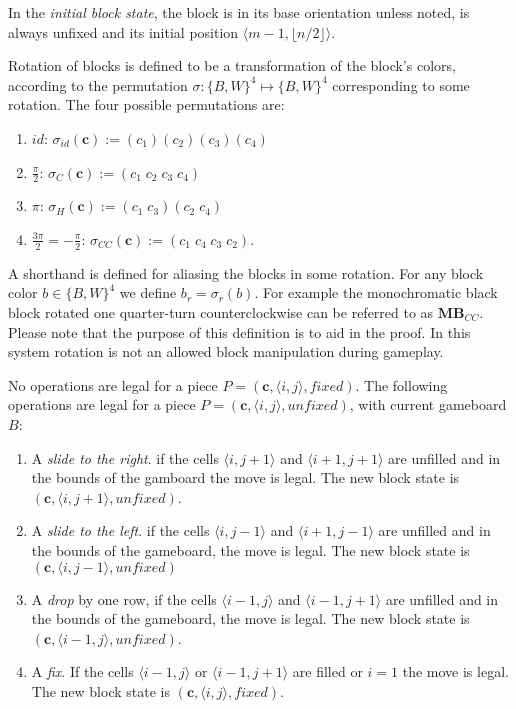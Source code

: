 \begin{description}[style=unboxed, leftmargin=0cm,labelsep=1em]
In the \textit{initial block state}, the block is in its base orientation unless noted, is always unfixed and its initial position $\langle m-1, \lfloor n/2 \rfloor \rangle$.

    \item[Rotating blocks] Rotation of blocks is defined to be a transformation of the block's colors, according to the permutation $\sigma: \{B,W\}^4 \mapsto \{B,W\}^4$ corresponding to some rotation. The four possible permutations are:

    \begin{enumerate}
        \item $id$: $\sigma_{id}(\mathbf{c}) := (c_1)(c_2)(c_3)(c_4)$
        \item $\frac{\pi}{2}$: $\sigma_{C}(\mathbf{c}) := (c_1\;c_2\;c_3\;c_4)$
        \item $\pi$: $\sigma_{H}(\mathbf{c}) := (c_1\;c_3)(c_2\;c_4)$
        \item $\frac{3 \pi}{2} = -\frac{\pi}{2}$: $\sigma_{CC}(\mathbf{c}) := (c_1\;c_4\;c_3\;c_2)$.
    \end{enumerate}

    A shorthand is defined for aliasing the blocks in some rotation. For any block color $b \in \{B, W\}^4$ we define $b_{r} = \sigma_{r}(b)$. For example the monochromatic black block rotated one quarter-turn counterclockwise can be referred to as $\mathbf{MB}_{CC}$. Please note that the purpose of this definition is to aid in the proof. In this system rotation is not an allowed block manipulation during gameplay.

    \item[Game operations] No operations are legal for a piece $P = (\mathbf{c}, \langle i,j \rangle, fixed)$. The following operations are legal for a piece $P = (\mathbf{c}, \langle i,j \rangle, unfixed)$, with current gameboard $B$:

    \begin{enumerate}
        \item A \emph{slide to the right}. if the cells $\langle i,j+1 \rangle$ and $\langle i+1, j+1 \rangle$ are unfilled and in the bounds of the gamboard the move is legal. The new block state is $(\mathbf{c}, \langle i, j+1 \rangle, unfixed)$.
    \item A \emph{slide to the left}. if the cells $\langle i,j-1 \rangle$ and $\langle i+1, j-1 \rangle$ are unfilled and in the bounds of the gameboard, the move is legal. The new block state is $(\mathbf{c}, \langle i, j-1 \rangle, unfixed)$
\item A \emph{drop} by one row, if the cells $\langle i-1, j \rangle$ and $\langle i-1, j+1 \rangle$ are unfilled and in the bounds of the gameboard, the move is legal. The new block state is $(\mathbf{c}, \langle i-1, j \rangle, unfixed)$.
        \item A \emph{fix}. If the cells $\langle i-1, j \rangle$ or $\langle i-1, j+1 \rangle$ are filled or $i=1$ the move is legal. The new block state is $(\mathbf{c}, \langle i, j \rangle, fixed)$.
    \end{enumerate}


\end{description}
